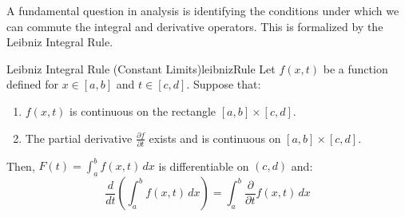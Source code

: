 \documentclass{book}
\begin{document}
A fundamental question in analysis is identifying the conditions under which we can commute the integral and derivative operators. This is formalized by the Leibniz Integral Rule.

\begin{thm}{Leibniz Integral Rule (Constant Limits)}{leibnizRule}
    Let $f(x, t)$ be a function defined for $x \in [a, b]$ and $t \in [c, d]$. Suppose that:
    \begin{enumerate}
        \item $f(x, t)$ is continuous on the rectangle $[a, b] \times [c, d]$.
        \item The partial derivative $\frac{\partial f}{\partial t}$ exists and is continuous on $[a, b] \times [c, d]$.
    \end{enumerate}
    Then, $F(t) = \int_{a}^{b} f(x, t) \, dx$ is differentiable on $(c, d)$ and:
    \[
        \frac{d}{dt} \left( \int_{a}^{b} f(x, t) \, dx \right) = \int_{a}^{b} \frac{\partial}{\partial t} f(x, t) \, dx
    \]
\end{thm}
\end{document}
